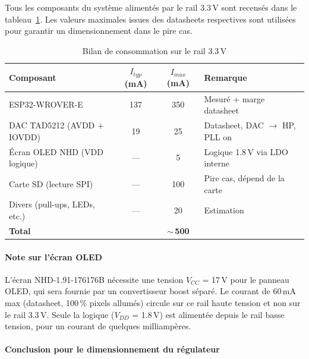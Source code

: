 Tous les composants du système alimentés par le rail 3.3\,V sont recensés dans le tableau~\ref{tab:conso_totale}. Les valeurs maximales issues des datasheets respectives sont utilisées pour garantir un dimensionnement dans le pire cas.

\begin{table}[H]
    \centering
    \caption{Bilan de consommation sur le rail 3.3\,V}
    \label{tab:conso_totale}
    \begin{tabular}{l c c l}
        \hline
        \textbf{Composant}            & \textbf{$I_{typ}$ (mA)} & \textbf{$I_{max}$ (mA)} & \textbf{Remarque}                       \\
        \hline
        ESP32-WROVER-E                & 137                     & 350                     & Mesuré + marge datasheet                \\
        DAC TAD5212 (AVDD + IOVDD)    & 19                      & 25                      & Datasheet, DAC $\rightarrow$ HP, PLL on \\
        Écran OLED NHD (VDD logique)  & ---                     & 5                       & Logique 1.8\,V via LDO interne          \\
        Carte SD (lecture SPI)        & ---                     & 100                     & Pire cas, dépend de la carte            \\
        Divers (pull-ups, LEDs, etc.) & ---                     & 20                      & Estimation                              \\
        \hline
        \textbf{Total}                &                         & \textbf{$\sim$\,500}    &                                         \\
        \hline
    \end{tabular}
\end{table}

\paragraph{Note sur l'écran OLED} L'écran NHD-1.91-176176B nécessite une tension $V_{CC}$ = 17\,V pour le panneau OLED, qui sera fournie par un convertisseur boost séparé. Le courant de 60\,mA max (datasheet, 100\,\% pixels allumés) circule sur ce rail haute tension et non sur le rail 3.3\,V. Seule la logique ($V_{DD}$ = 1.8\,V) est alimentée depuis le rail basse tension, pour un courant de quelques milliampères.

\paragraph{Conclusion pour le dimensionnement du régulateur}


